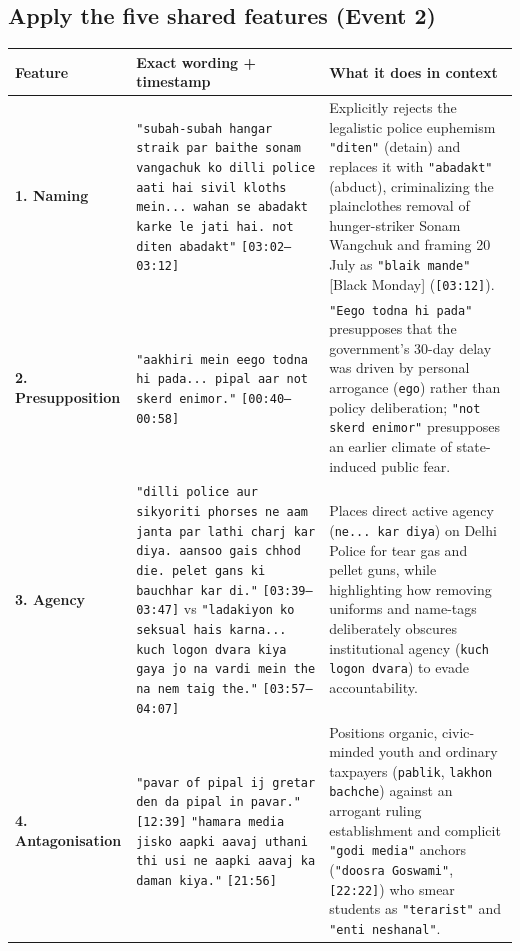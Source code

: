 \documentclass[10pt,a4paper]{article}
\begin{document}
\subsection*{Apply the five shared features (Event 2)}
\begin{longtable}{@{}>{\raggedright\arraybackslash}p{} >{\raggedright\arraybackslash}p{} >{\raggedright\arraybackslash}p{}@{}}
\toprule
\textbf{Feature} & \textbf{Exact wording + timestamp} & \textbf{What it does in context} \\
\midrule
\endhead
\textbf{1. Naming} & \texttt{"subah-subah hangar straik par baithe sonam vangachuk ko dilli police aati hai sivil kloths mein... wahan se abadakt karke le jati hai. not diten abadakt"} \texttt{[03:02--03:12]} & Explicitly rejects the legalistic police euphemism \texttt{"diten"} (detain) and replaces it with \texttt{"abadakt"} (abduct), criminalizing the plainclothes removal of hunger-striker Sonam Wangchuk and framing 20 July as \texttt{"blaik mande"} [Black Monday] (\texttt{[03:12]}). \\
\addlinespace[4pt]
\textbf{2. Presupposition} & \texttt{"aakhiri mein eego todna hi pada... pipal aar not skerd enimor."} \texttt{[00:40--00:58]} & \texttt{"Eego todna hi pada"} presupposes that the government's 30-day delay was driven by personal arrogance (\texttt{ego}) rather than policy deliberation; \texttt{"not skerd enimor"} presupposes an earlier climate of state-induced public fear. \\
\addlinespace[4pt]
\textbf{3. Agency} & \texttt{"dilli police aur sikyoriti phorses ne aam janta par lathi charj kar diya. aansoo gais chhod die. pelet gans ki bauchhar kar di."} \texttt{[03:39--03:47]} vs \texttt{"ladakiyon ko seksual hais karna... kuch logon dvara kiya gaya jo na vardi mein the na nem taig the."} \texttt{[03:57--04:07]} & Places direct active agency (\texttt{ne... kar diya}) on Delhi Police for tear gas and pellet guns, while highlighting how removing uniforms and name-tags deliberately obscures institutional agency (\texttt{kuch logon dvara}) to evade accountability. \\
\addlinespace[4pt]
\textbf{4. Antagonisation} & \texttt{"pavar of pipal ij gretar den da pipal in pavar."} \texttt{[12:39]} \newline  \texttt{"hamara media jisko aapki aavaj uthani thi usi ne aapki aavaj ka daman kiya."} \texttt{[21:56]} & Positions organic, civic-minded youth and ordinary taxpayers (\texttt{pablik}, \texttt{lakhon bachche}) against an arrogant ruling establishment and complicit \texttt{"godi media"} anchors (\texttt{"doosra Goswami"}, \texttt{[22:22]}) who smear students as \texttt{"terarist"} and \texttt{"enti neshanal"}. \\

\end{longtable}
\end{document}
